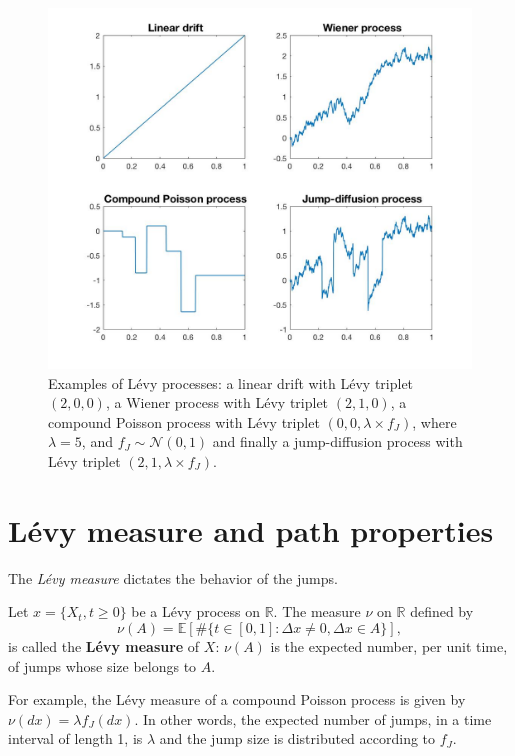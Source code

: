 \begin{figure}[!htb]
	\includegraphics[width=\textwidth]{gfx/processes_examples}
	\caption{Examples of L\'evy processes: a linear drift with L\'evy triplet $(2,0,0)$, a Wiener process with L\'evy triplet $(2,1,0)$, a compound Poisson process with L\'evy triplet $(0,0,\lambda\times f_J)$, where $\lambda = 5$, and $f_J\sim\mathcal{N}(0,1)$ and finally a jump-diffusion process with L\'evy triplet $(2,1,\lambda\times f_J)$.}
	\label{fig:Levy:examples}
\end{figure}

\section{L\'evy measure and path properties}
\label{sec:Levy:Levy_measure}
The \textit{L\'evy measure} dictates the behavior of the jumps.
\begin{defn}
Let $x = \{X_t,t\geq 0\}$ be a L\'evy process on $\mathbb{R}$. The measure $\nu$ on $\mathbb{R}$ defined by
$$\nu(A) = \mathbb{E}\left[\#\{t\in[0,1]:\Delta x \neq 0, \Delta x\in A\}\right],$$
is called the \textbf{L\'evy measure} of $X$: $\nu(A)$ is the expected number, per unit time, of jumps whose size belongs to $A$.
\end{defn}

For example, the L\'evy measure of a compound Poisson process is given by $\nu(dx) = \lambda f_J(dx)$. In other words, the expected number of jumps, in a time interval of length 1, is $\lambda$ and the jump size is distributed according to $f_J$.

